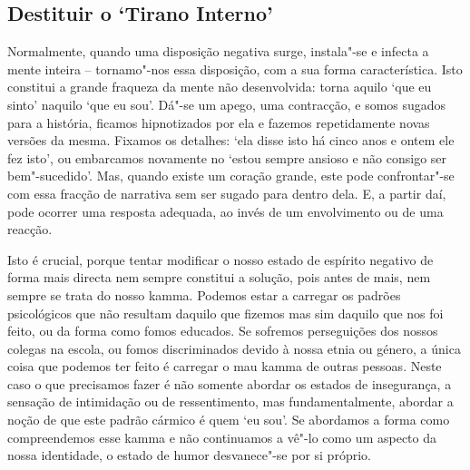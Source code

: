 \subsection{Destituir o `Tirano Interno'}

Normalmente, quando uma disposição negativa surge, instala"-se e infecta a mente
inteira -- tornamo"-nos essa disposição, com a sua forma característica. Isto
constitui a grande fraqueza da mente não desenvolvida: torna aquilo `que eu
sinto' naquilo `que eu sou'. Dá"-se um apego, uma contracção, e somos sugados
para a história, ficamos hipnotizados por ela e fazemos repetidamente novas
versões da mesma. Fixamos os detalhes: `ela disse isto há cinco anos e ontem ele
fez isto', ou embarcamos novamente no `estou sempre ansioso e não consigo ser
bem"-sucedido'. Mas, quando existe um coração grande, este pode confrontar"-se com
essa fracção de narrativa sem ser sugado para dentro dela. E, a partir daí, pode
ocorrer uma resposta adequada, ao invés de um envolvimento ou de uma reacção.

\enlargethispage{\baselineskip}

Isto é crucial, porque tentar modificar o nosso estado de espírito negativo de
forma mais directa nem sempre constitui a solução, pois antes de mais, nem
sempre se trata do nosso kamma. Podemos estar a carregar os padrões psicológicos
que não resultam daquilo que fizemos mas sim daquilo que nos foi feito, ou da
forma como fomos educados. Se sofremos perseguições dos nossos colegas na
escola, ou fomos discriminados devido à nossa etnia ou género, a única coisa que
podemos ter feito é carregar o mau kamma de outras pessoas. Neste caso o que
precisamos fazer é não somente abordar os estados de insegurança, a sensação de
intimidação ou de ressentimento, mas fundamentalmente, abordar a noção de que
este padrão cármico é quem `eu sou'. Se abordamos a forma como compreendemos
esse kamma e não continuamos a vê"-lo como um aspecto da nossa identidade, o
estado de humor desvanece"-se por si próprio.

\enlargethispage{\baselineskip}

